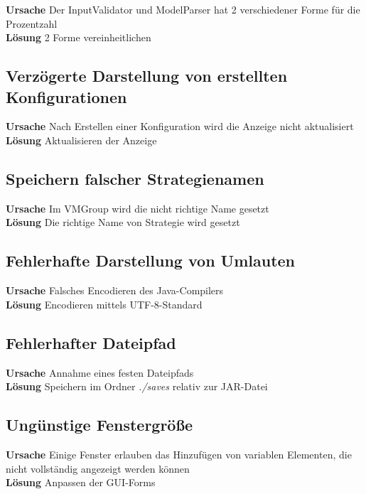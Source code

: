 \textbf{Ursache} Der InputValidator und ModelParser hat 2 verschiedener Forme für die Prozentzahl\\
\textbf{Lösung} 2 Forme vereinheitlichen

\subsection{Verzögerte Darstellung von erstellten Konfigurationen}

\textbf{Ursache} Nach Erstellen einer Konfiguration wird die Anzeige nicht aktualisiert\\
\textbf{Lösung} Aktualisieren der Anzeige

\subsection{Speichern falscher Strategienamen}

\textbf{Ursache} Im VMGroup wird die nicht richtige Name gesetzt\\
\textbf{Lösung} Die richtige Name von Strategie wird gesetzt

\subsection{Fehlerhafte Darstellung von Umlauten}

\textbf{Ursache} Falsches Encodieren des Java-Compilers\\
\textbf{Lösung} Encodieren mittels UTF-8-Standard

\subsection{Fehlerhafter Dateipfad}

\textbf{Ursache} Annahme eines festen Dateipfads\\
\textbf{Lösung} Speichern im Ordner \emph{./saves} relativ zur JAR-Datei

\subsection{Ungünstige Fenstergröße}

\textbf{Ursache} Einige Fenster erlauben das Hinzufügen von variablen Elementen, die nicht vollständig angezeigt werden können\\
\textbf{Lösung} Anpassen der GUI-Forms

